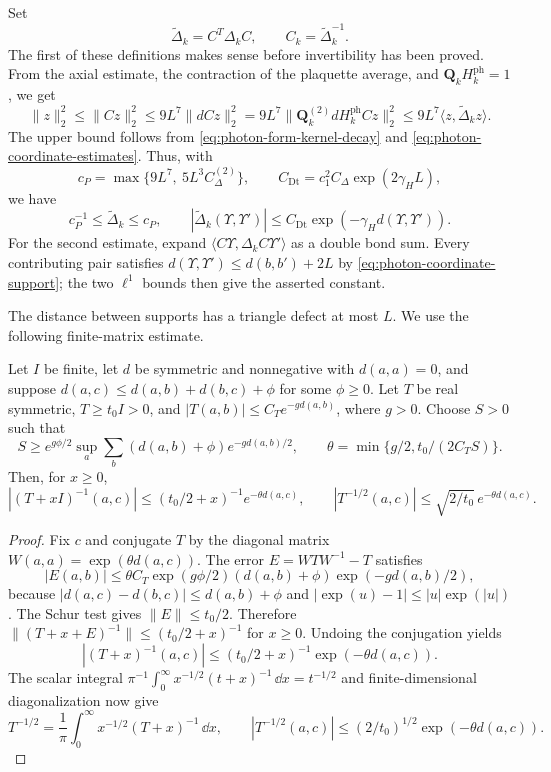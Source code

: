 Set
\[
 \widetilde\Delta_k=C^T\Delta_k C,
 \qquad C_k=\widetilde\Delta_k^{-1}.
\]
The first of these definitions makes sense before invertibility
has been proved. From the axial estimate, the contraction of the
plaquette average, and $\mathbf Q_kH_k^{\mathrm{ph}}=1$, we get
\[
 \|z\|_2^2\le\|Cz\|_2^2
 \le9L^7\|dCz\|_2^2
 =9L^7\|\mathbf Q_k^{(2)}dH_k^{\mathrm{ph}}Cz\|_2^2
 \le9L^7\langle z,\widetilde\Delta_kz\rangle.
\]
The upper bound follows from
\eqref{eq:photon-form-kernel-decay} and
\eqref{eq:photon-coordinate-estimates}. Thus, with
\[
 c_P=\max\{9L^7,\ 5L^3 C_\Delta^{(2)}\},
 \qquad
 C_{\mathrm{Dt}}=c_1^2C_\Delta\exp(2\gamma_HL),
\]
we have
\begin{equation}\label{eq:photon-fluctuation-form-estimates}
 c_P^{-1}\le\widetilde\Delta_k\le c_P,
 \qquad
 |\widetilde\Delta_k(\Upsilon,\Upsilon')|
       \le C_{\mathrm{Dt}}\exp(-\gamma_Hd(\Upsilon,\Upsilon')).
\end{equation}
For the second estimate, expand
$\langle C\Upsilon,\Delta_kC\Upsilon'\rangle$ as a double bond
sum. Every contributing pair satisfies
$d(\Upsilon,\Upsilon')\le d(b,b')+2L$ by
\eqref{eq:photon-coordinate-support}; the two $\ell^1$ bounds
then give the asserted constant.

The distance between supports has a triangle defect at most $L$.
We use the following finite-matrix estimate.

\begin{lemma}\label{lem:positive-root-locality}
Let $I$ be finite, let $d$ be symmetric and nonnegative with
$d(a,a)=0$, and suppose
$d(a,c)\le d(a,b)+d(b,c)+\phi$ for some $\phi\ge0$.
Let $T$ be real symmetric, $T\ge t_0I>0$, and
$|T(a,b)|\le C_Te^{-gd(a,b)}$, where $g>0$.
Choose $S>0$ such that
\[
 S\ge e^{g\phi/2}\sup_a\sum_b(d(a,b)+\phi)e^{-gd(a,b)/2},
 \qquad
 \theta=\min\{g/2,t_0/(2C_TS)\}.
\]
Then, for $x\ge0$,
\[
 |(T+xI)^{-1}(a,c)|\le(t_0/2+x)^{-1}e^{-\theta d(a,c)},
 \qquad
 |T^{-1/2}(a,c)|\le\sqrt{2/t_0}\,e^{-\theta d(a,c)}.
\]
\end{lemma}
\begin{proof}
Fix $c$ and conjugate $T$ by the diagonal matrix
$W(a,a)=\exp(\theta d(a,c))$. The error $E=WTW^{-1}-T$ satisfies
\[
 |E(a,b)|\le\theta C_T\exp(g\phi/2)(d(a,b)+\phi)
                                      \exp(-g d(a,b)/2),
\]
because $|d(a,c)-d(b,c)|\le d(a,b)+\phi$ and
$|\exp(u)-1|\le|u|\exp(|u|)$. The Schur test gives
$\|E\|\le t_0/2$. Therefore
$\|(T+x+E)^{-1}\|\le(t_0/2+x)^{-1}$ for $x\ge0$.
Undoing the conjugation yields
\[
 |(T+x)^{-1}(a,c)|\le(t_0/2+x)^{-1}\exp(-\theta d(a,c)).
\]
The scalar integral
$\pi^{-1}\int_0^\infty x^{-1/2}(t+x)^{-1}\,\dd x=t^{-1/2}$
and finite-dimensional diagonalization now give
\begin{equation}\label{eq:photon-root-integral}
 T^{-1/2}=\frac1\pi\int_0^\infty x^{-1/2}(T+x)^{-1}\,\dd x,
 \qquad
 |T^{-1/2}(a,c)|\le(2/t_0)^{1/2}\exp(-\theta d(a,c)).
\end{equation}

\end{proof}

